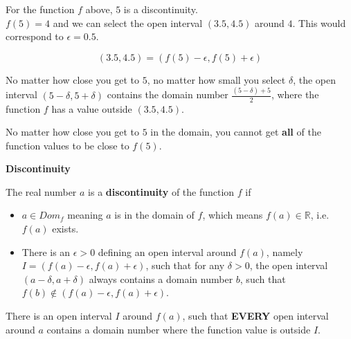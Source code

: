 \documentclass{ximera}
\begin{document}
\begin{observation}

For the function $f$ above, $5$ is a discontinuity. \\


$f(5) = 4$ and we can select the open interval $(3.5, 4.5)$ around $4$.   This would correspond to $\epsilon = 0.5$.

\[   (3.5, 4.5) = (f(5) - \epsilon, f(5) + \epsilon)    \]


No matter how close you get to $5$, no matter how small you select $\delta$, the open interval $(5 - \delta, 5 + \delta)$ contains the domain number $\frac{(5 - \delta) + 5}{2}$, where the function $f$ has a value outside $(3.5, 4.5)$.


No matter how close you get to $5$ in the domain, you cannot get \textbf{\textcolor{blue!55!black}{all}} of the function values to be close to $f(5)$.

\end{observation}



















\begin{definition} \textbf{\textcolor{green!50!black}{Discontinuity}}

The real number $a$ is a \textbf{discontinuity} of the function $f$ if

\begin{itemize}
\item $a \in Dom_f$ meaning $a$ is in the domain of $f$, which means $f(a) \in \mathbb{R}$, i.e. $f(a)$ exists.
\item There is an $\epsilon > 0$ defining an open interval around $f(a)$, namely $I = (f(a) - \epsilon, f(a) + \epsilon)$, such that for any $\delta > 0$, the open interval $(a - \delta, a + \delta)$ always contains a domain number $b$, such that $f(b) \not\in(f(a)-\epsilon, f(a)+\epsilon)$.
\end{itemize}

There is an open interval $I$ around $f(a)$, such that \textbf{\textcolor{purple!85!blue}{EVERY}} open interval around $a$ contains a domain number where the function value is outside $I$.

\end{definition}
\end{document}
